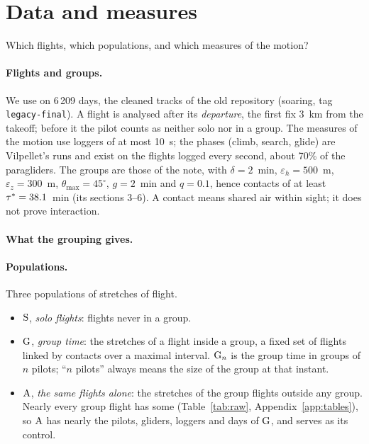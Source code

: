 \section{Data and measures}\label{sec:setup}

Which flights, which populations, and which measures of the motion?

\paragraph{Flights and groups.} We use  on 6\,209 days, the cleaned tracks
of the old repository (soaring, tag \texttt{legacy-final}). A flight is analysed after its
\emph{departure}, the first fix 3~km from the takeoff; before it the pilot counts as neither solo
nor in a group. The measures of the motion use loggers of at most 10~s; the phases (climb, search,
glide) are Vilpellet's runs and exist on the flights logged every second, about 70\% of the
paragliders. The groups are those of the note, with $\delta=2$~min, $\varepsilon_h=500$~m,
$\varepsilon_z=300$~m, $\theta_{\max}=45^\circ$, $g=2$~min and $q=0.1$, hence contacts of at least
$\tau^*=38.1$~min (its sections 3--6). A contact means shared air within sight; it does not
prove interaction.

\paragraph{What the grouping gives.} 

\paragraph{Populations.} Three populations of stretches of flight.
\begin{itemize}
  \item $\mathrm{S}$, \emph{solo flights}: flights never in a group.
  \item $\mathrm{G}$, \emph{group time}: the stretches of a flight inside a group, a fixed set of flights
        linked by contacts over a maximal interval. $\mathrm{G}_n$ is the group time in groups of $n$
        pilots; ``$n$ pilots'' always means the size of the group at that instant.
  \item $\mathrm{A}$, \emph{the same flights alone}: the stretches of the group flights outside any
        group. Nearly every group flight has some (Table~\ref{tab:raw}, Appendix~\ref{app:tables}), so $\mathrm{A}$ has nearly
        the pilots, gliders, loggers and days of $\mathrm{G}$, and serves as its control.
\end{itemize}

